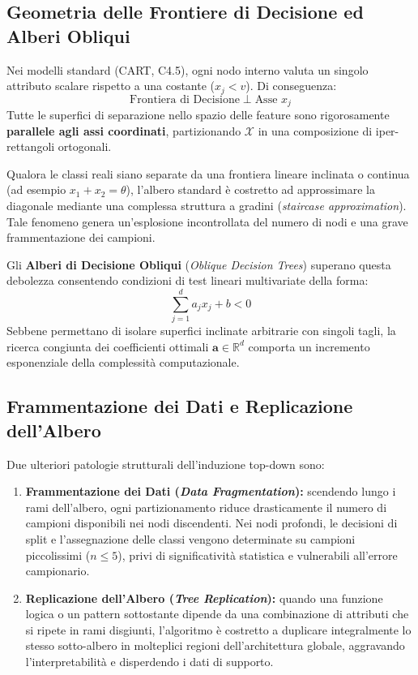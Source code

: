 \FloatBarrier
\subsection{Geometria delle Frontiere di Decisione ed Alberi Obliqui}
\label{subsec:dm-decision-boundaries-oblique}

Nei modelli standard (CART, C4.5), ogni nodo interno valuta un singolo attributo scalare rispetto a una costante ($x_j < v$). Di conseguenza:
\begin{equation}
    \text{Frontiera di Decisione} \perp \text{Asse } x_j
\end{equation}
Tutte le superfici di separazione nello spazio delle feature sono rigorosamente \textbf{parallele agli assi coordinati}, partizionando $\mathcal{X}$ in una composizione di iper-rettangoli ortogonali.

Qualora le classi reali siano separate da una frontiera lineare inclinata o continua (ad esempio $x_1 + x_2 = \theta$), l'albero standard è costretto ad approssimare la diagonale mediante una complessa struttura a gradini (\textit{staircase approximation}). Tale fenomeno genera un'esplosione incontrollata del numero di nodi e una grave frammentazione dei campioni.

Gli \textbf{Alberi di Decisione Obliqui} (\textit{Oblique Decision Trees}) superano questa debolezza consentendo condizioni di test lineari multivariate della forma:
\begin{equation}
    \sum_{j=1}^d a_j x_j + b < 0
\end{equation}
Sebbene permettano di isolare superfici inclinate arbitrarie con singoli tagli, la ricerca congiunta dei coefficienti ottimali $\mathbf{a} \in \mathbb{R}^d$ comporta un incremento esponenziale della complessità computazionale.

\FloatBarrier
\subsection{Frammentazione dei Dati e Replicazione dell'Albero}
\label{subsec:dm-fragmentation-replication}

Due ulteriori patologie strutturali dell'induzione top-down sono:
\begin{enumerate}
    \item \textbf{Frammentazione dei Dati (\textit{Data Fragmentation}):} scendendo lungo i rami dell'albero, ogni partizionamento riduce drasticamente il numero di campioni disponibili nei nodi discendenti. Nei nodi profondi, le decisioni di split e l'assegnazione delle classi vengono determinate su campioni piccolissimi ($n \le 5$), privi di significatività statistica e vulnerabili all'errore campionario.
    \item \textbf{Replicazione dell'Albero (\textit{Tree Replication}):} quando una funzione logica o un pattern sottostante dipende da una combinazione di attributi che si ripete in rami disgiunti, l'algoritmo è costretto a duplicare integralmente lo stesso sotto-albero in molteplici regioni dell'architettura globale, aggravando l'interpretabilità e disperdendo i dati di supporto.
\end{enumerate}

